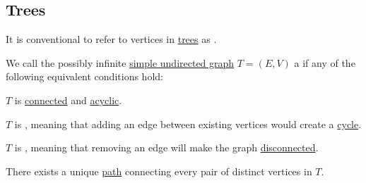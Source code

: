 \subsection{Trees}\label{subsec:trees}

\begin{remark}\label{rem:vertices_called_nodes}
  It is conventional to refer to vertices in \hyperref[def:tree]{trees} as .
\end{remark}

\begin{definition}\label{def:tree}
  We call the possibly infinite \hyperref[def:undirected_graph]{simple undirected graph} \( T = (E, V) \) a  if any of the following equivalent conditions hold:
  \begin{thmenum}
     \( T \) is \hyperref[def:graph_connectedness/undirected]{connected} and \hyperref[def:acyclic_graph]{acyclic}.

     \( T \) is , meaning that adding an edge between existing vertices would create a \hyperref[def:graph_cycle]{cycle}.

     \( T \) is , meaning that removing an edge will make the graph \hyperref[def:graph_connectedness/undirected]{disconnected}.

     There exists a unique \hyperref[def:graph_walk/path]{path} connecting every pair of distinct vertices in \( T \).
  \end{thmenum}
\end{definition}
